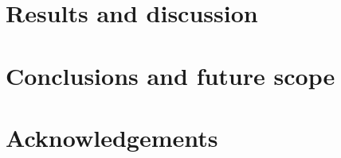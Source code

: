 \documentclass[preprint,12pt]{elsarticle}
\begin{document}
\section{Results and discussion}
\label{sec:results}

\section{Conclusions and future scope}
\label{sec:conclusion}

\section*{Acknowledgements}



\end{document}
